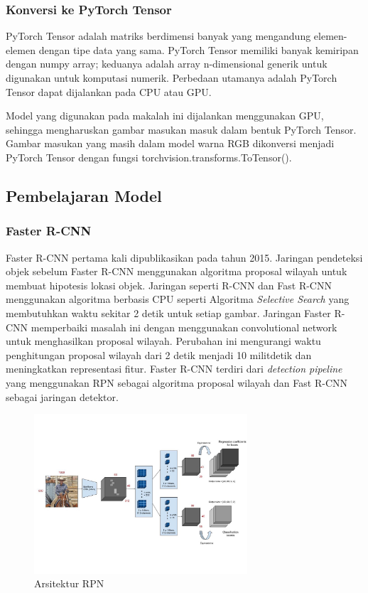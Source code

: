 \documentclass{article}
\begin{document}
	  	\subsubsection{Konversi ke PyTorch Tensor}
	  	PyTorch Tensor adalah matriks berdimensi banyak yang mengandung elemen-elemen dengan tipe data yang sama. PyTorch Tensor memiliki banyak kemiripan dengan numpy array; keduanya adalah array n-dimensional generik untuk digunakan untuk komputasi numerik. Perbedaan utamanya adalah PyTorch Tensor dapat dijalankan pada CPU atau GPU.
	  	\par
	  	Model yang digunakan pada makalah ini dijalankan menggunakan GPU, sehingga mengharuskan gambar masukan masuk dalam bentuk PyTorch Tensor. Gambar masukan yang masih dalam model warna RGB dikonversi menjadi PyTorch Tensor dengan fungsi torchvision.transforms.ToTensor(). 
  	\subsection{Pembelajaran Model}
  	 \subsubsection{Faster R-CNN}
  	 \par Faster R-CNN pertama kali dipublikasikan pada tahun 2015. Jaringan pendeteksi objek sebelum Faster R-CNN menggunakan algoritma proposal wilayah untuk membuat hipotesis lokasi objek. Jaringan seperti R-CNN dan Fast R-CNN menggunakan algoritma berbasis CPU seperti Algoritma \textit{Selective Search} yang membutuhkan waktu sekitar 2 detik untuk setiap gambar. Jaringan Faster R-CNN memperbaiki masalah ini dengan menggunakan convolutional network untuk menghasilkan proposal wilayah. Perubahan ini mengurangi waktu penghitungan proposal wilayah dari 2 detik menjadi 10 militdetik dan meningkatkan representasi fitur. Faster R-CNN terdiri dari \textit{detection pipeline} yang menggunakan RPN sebagai algoritma proposal wilayah dan Fast R-CNN sebagai jaringan detektor.\cite{shilpa_2020}
  	 
  	 \begin{figure}[H]
  	 	\centering
  	 	\includegraphics[width=300px]{arsitektur/RPN.jpeg}
  	 	\caption{Arsitektur RPN}
  	 \end{figure}
   
\end{document}

